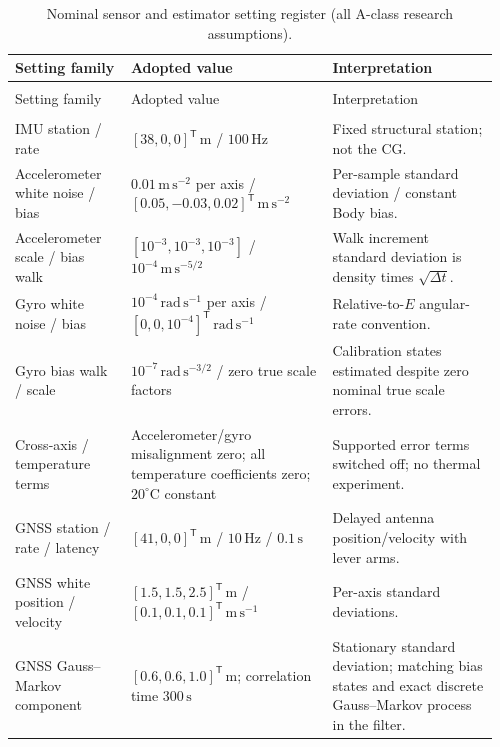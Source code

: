 \begingroup\small\setlength{\tabcolsep}{4pt}\renewcommand{\arraystretch}{1.1}
\begin{longtable}{@{}>{\raggedright\arraybackslash}p{0.23\linewidth}>{\raggedright\arraybackslash}p{0.4\linewidth}>{\raggedright\arraybackslash}p{0.33\linewidth}@{}}
\caption{Nominal sensor and estimator setting register (all A-class research assumptions).}\label{tab:app-sensor-filter}\\
\toprule
Setting family & Adopted value & Interpretation \\
\midrule\endfirsthead
\multicolumn{3}{l}{\small\textit{Table \ref{tab:app-sensor-filter} continued}}\\
\toprule
Setting family & Adopted value & Interpretation \\
\midrule\endhead
\midrule\multicolumn{3}{r}{\small\textit{Continued on next page}}\\\endfoot
\bottomrule\endlastfoot
IMU station / rate & $[38,0,0]^{\mathsf T}\,\mathrm{m}$ / $100\,\mathrm{Hz}$ & Fixed structural station; not the CG. \\
Accelerometer white noise / bias & $0.01\,\mathrm{m\,s^{-2}}$ per axis / $[0.05,-0.03,0.02]^{\mathsf T}\,\mathrm{m\,s^{-2}}$ & Per-sample standard deviation / constant Body bias. \\
Accelerometer scale / bias walk & $[10^{-3},10^{-3},10^{-3}]$ / $10^{-4}\,\mathrm{m\,s^{-5/2}}$ & Walk increment standard deviation is density times $\sqrt{\Delta t}$. \\
Gyro white noise / bias & $10^{-4}\,\mathrm{rad\,s^{-1}}$ per axis / $[0,0,10^{-4}]^{\mathsf T}\,\mathrm{rad\,s^{-1}}$ & Relative-to-$E$ angular-rate convention. \\
Gyro bias walk / scale & $10^{-7}\,\mathrm{rad\,s^{-3/2}}$ / zero true scale factors & Calibration states estimated despite zero nominal true scale errors. \\
Cross-axis / temperature terms & Accelerometer/gyro misalignment zero; all temperature coefficients zero; $20^\circ\mathrm{C}$ constant & Supported error terms switched off; no thermal experiment. \\
GNSS station / rate / latency & $[41,0,0]^{\mathsf T}\,\mathrm{m}$ / $10\,\mathrm{Hz}$ / $0.1\,\mathrm{s}$ & Delayed antenna position/velocity with lever arms. \\
GNSS white position / velocity & $[1.5,1.5,2.5]^{\mathsf T}\,\mathrm{m}$ / $[0.1,0.1,0.1]^{\mathsf T}\,\mathrm{m\,s^{-1}}$ & Per-axis standard deviations. \\
GNSS Gauss--Markov component & $[0.6,0.6,1.0]^{\mathsf T}\,\mathrm{m}$; correlation time $300\,\mathrm{s}$ & Stationary standard deviation; matching bias states and exact discrete Gauss--Markov process in the filter. \\

\end{longtable}
